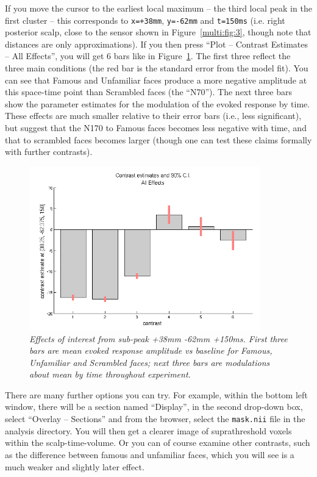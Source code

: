 If you move the cursor to the earliest local maximum -- the third local peak in the first cluster -- this corresponds to \texttt{x=+38mm}, \texttt{y=-62mm} and \texttt{t=150ms} (i.e. right posterior scalp, close to the sensor shown in Figure~\ref{multi:fig:3}, though note that distances are only approximations). If you then press ``Plot -- Contrast Estimates -- All Effects'', you will get 6 bars like in Figure~\ref{multi:fig:7}. The first three reflect the three main conditions (the red bar is the standard error from the model fit). You can see that Famous and Unfamiliar faces produce a more negative amplitude at this space-time point than Scrambled faces (the ``N70''). The next three bars show the parameter estimates for the modulation of the evoked response by time. These effects are much smaller relative to their error bars (i.e., less significant), but suggest that the N170 to Famous faces becomes less negative with time, and that to scrambled faces becomes larger (though one can test these claims formally with further contrasts).

\begin{figure}
\begin{center}
\includegraphics[width=100mm]{multi/figures/figure7}
\caption{\em Effects of interest from sub-peak +38mm -62mm +150ms. First three bars are mean evoked response amplitude vs baseline for Famous, Unfamiliar and Scrambled faces; next three bars are modulations about mean by time throughout experiment. \label{multi:fig:7}}
\end{center}
\end{figure}

There are many further options you can try. For example, within the bottom left window, there will be a section named ``Display'', in the second drop-down box, select ``Overlay -- Sections'' and from the browser, select the \texttt{mask.nii} file in the analysis directory. You will then get a clearer image of suprathreshold voxels within the scalp-time-volume. Or you can of course examine other contrasts, such as the difference between famous and unfamiliar faces, which you will see is a much weaker and slightly later effect.

